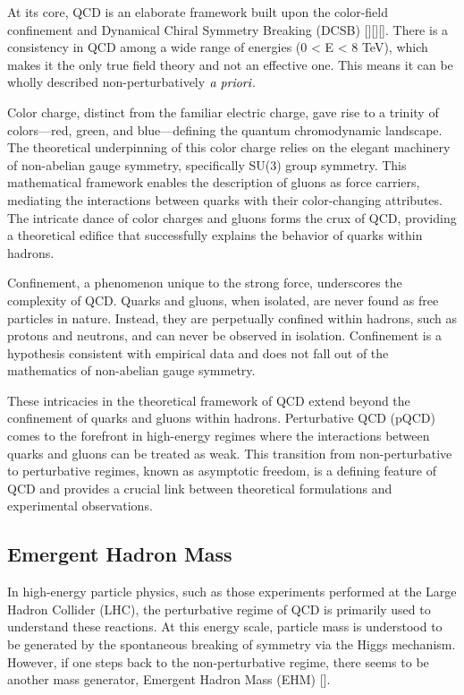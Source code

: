 \documentclass[
]{report}
\begin{document}
At its core, QCD is an elaborate framework built upon the color-field
confinement and Dynamical Chiral Symmetry Breaking (DCSB)
{[}\cite{horn_pion_2016}{]}{[}\cite{roberts_hadron_2015}{]}{[}\cite{roberts_three_2016}{]}.
There is a consistency in QCD among a wide range of energies (0
\textless{} E \textless{} 8 TeV), which makes it the only true field
theory and not an effective one. This means it can be wholly described
non-perturbatively \(\emph{a priori}\).

Color charge, distinct from the familiar electric charge, gave rise to a
trinity of colors---red, green, and blue---defining the quantum
chromodynamic landscape. The theoretical underpinning of this color
charge relies on the elegant machinery of non-abelian gauge symmetry,
specifically SU(3) group symmetry. This mathematical framework enables
the description of gluons as force carriers, mediating the interactions
between quarks with their color-changing attributes. The intricate dance
of color charges and gluons forms the crux of QCD, providing a
theoretical edifice that successfully explains the behavior of quarks
within hadrons.

Confinement, a phenomenon unique to the strong force, underscores the
complexity of QCD. Quarks and gluons, when isolated, are never found as
free particles in nature. Instead, they are perpetually confined within
hadrons, such as protons and neutrons, and can never be observed in
isolation. Confinement is a hypothesis consistent with empirical data
and does not fall out of the mathematics of non-abelian gauge symmetry.

These intricacies in the theoretical framework of QCD extend beyond the
confinement of quarks and gluons within hadrons. Perturbative QCD (pQCD)
comes to the forefront in high-energy regimes where the interactions
between quarks and gluons can be treated as weak. This transition from
non-perturbative to perturbative regimes, known as asymptotic freedom,
is a defining feature of QCD and provides a crucial link between
theoretical formulations and experimental observations.

\hypertarget{emergent-hadron-mass}{%
\subsection{Emergent Hadron Mass}\label{emergent-hadron-mass}}

In high-energy particle physics, such as those experiments performed at
the Large Hadron Collider (LHC), the perturbative regime of QCD is
primarily used to understand these reactions. At this energy scale,
particle mass is understood to be generated by the spontaneous breaking
of symmetry via the Higgs mechanism. However, if one steps back to the
non-perturbative regime, there seems to be another mass generator,
Emergent Hadron Mass (EHM) {[}\cite{cheng_baryon_2024}{]}.
\end{document}
